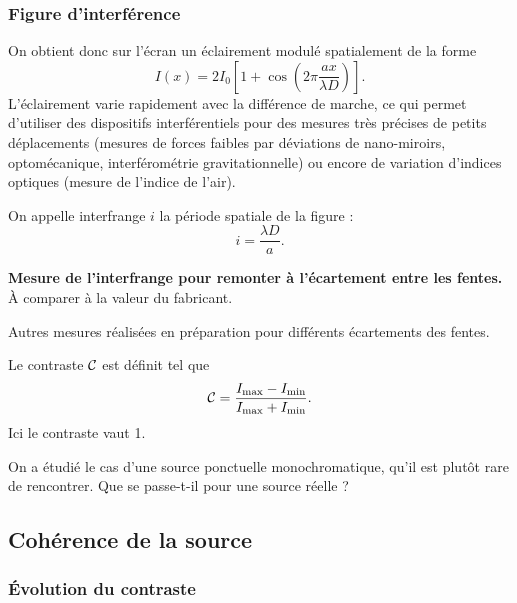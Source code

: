 \subsubsection{Figure d'interférence}

On obtient donc sur l'écran un éclairement modulé spatialement de la forme
\begin{equation}
I(x) = 2I_0 \left[1+\cos\left(2\pi\frac{ax}{\lambda D}\right) \right].
\end{equation}
L'éclairement varie rapidement avec la différence de marche, ce qui permet d'utiliser des dispositifs interférentiels pour des mesures très précises de petits déplacements (mesures de forces faibles par déviations de nano-miroirs, optomécanique, interférométrie gravitationnelle) ou encore de variation d'indices optiques (mesure de l'indice de l'air).

On appelle interfrange $i$ la période spatiale de la figure :
\begin{equation}
i = \frac{\lambda D}{a}.
\end{equation}

\begin{experience}
\textbf{Mesure de l'interfrange pour remonter à l'écartement entre les fentes.}
À comparer à la valeur du fabricant.
\end{experience}

\begin{slide}
Autres mesures réalisées en préparation pour différents écartements des fentes.
\end{slide}

Le contraste ${\cal{C}}$ est définit tel que
\begin{equation}
{\cal{C}} = \frac{I_\mathrm{max}-I_\mathrm{min}}{I_\mathrm{max}+I_\mathrm{min}}.
\end{equation}
Ici le contraste vaut 1.

\begin{transition}
On a étudié le cas d'une source ponctuelle monochromatique, qu'il est plutôt rare de rencontrer.
Que se passe-t-il pour une source réelle ?
\end{transition}

\subsection{Cohérence de la source}

\subsubsection{Évolution du contraste}

